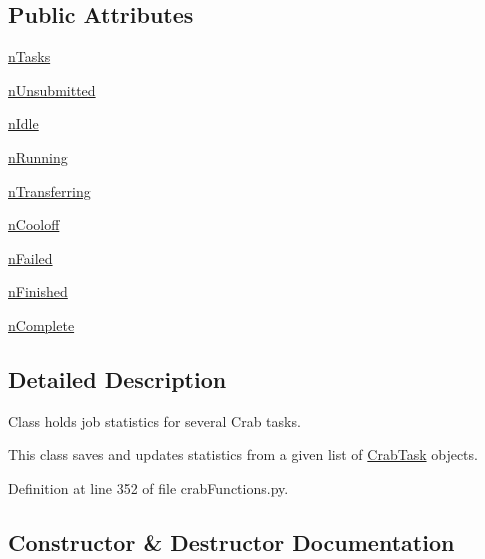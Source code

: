 \subsection*{Public Attributes}
\begin{DoxyCompactItemize}
\item 
\hyperlink{classcrabFunctions_1_1TaskStats_aa2a199c6eeb3f0cbfad13cb458a2ffa1}{n\-Tasks}
\item 
\hyperlink{classcrabFunctions_1_1TaskStats_a91781bd3f7db872c3e3b8f8dca88ad8c}{n\-Unsubmitted}
\item 
\hyperlink{classcrabFunctions_1_1TaskStats_a10bcdc4847da02b0183894ebbeef7eac}{n\-Idle}
\item 
\hyperlink{classcrabFunctions_1_1TaskStats_ac8b0b9fae6f5398b73ef7646eaa164d3}{n\-Running}
\item 
\hyperlink{classcrabFunctions_1_1TaskStats_a22b092ce1a1ab49d187a3d40742bc278}{n\-Transferring}
\item 
\hyperlink{classcrabFunctions_1_1TaskStats_a908801848c366406dd14f3579743a31b}{n\-Cooloff}
\item 
\hyperlink{classcrabFunctions_1_1TaskStats_a0900215fe8b4ed020f061b9baf958238}{n\-Failed}
\item 
\hyperlink{classcrabFunctions_1_1TaskStats_a4815c63ede659418e3a6bbd972f5c052}{n\-Finished}
\item 
\hyperlink{classcrabFunctions_1_1TaskStats_aef3b2fc329882ae5e4384f1ff24347d0}{n\-Complete}
\end{DoxyCompactItemize}


\subsection{Detailed Description}
Class holds job statistics for several Crab tasks. 

This class saves and updates statistics from a given list of \hyperlink{classcrabFunctions_1_1CrabTask}{Crab\-Task} objects. 

Definition at line 352 of file crab\-Functions.\-py.



\subsection{Constructor \& Destructor Documentation}
